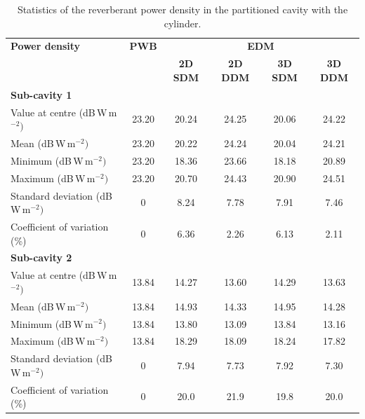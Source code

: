 \documentclass[a4paper]{article}
\numberwithin{equation}{section}
\begin{document}
\begin{table}[ht]
\begin{center}
\begin{tabular}{|l|c|c|c|c|c|}
\hline
\textbf{Power density}               &\textbf{PWB} &\multicolumn{4}{|c|}{\textbf{EDM}} \\ \cline{3-6}
{}                                   &{}           &\textbf{2D SDM} &\textbf{2D DDM} &\textbf{3D SDM} &\textbf{3D DDM} \\
\hline
\multicolumn{6}{|l|}{\textbf{Sub-cavity 1}} \\
\hline
Value at centre (dB\,W\,m$^{-2})$    &23.20        &20.24           &24.25           &20.06           &24.22 \\
Mean (dB\,W\,m$^{-2})$               &23.20        &20.22           &24.24           &20.04           &24.21 \\
Minimum (dB\,W\,m$^{-2})$            &23.20        &18.36           &23.66           &18.18           &20.89 \\
Maximum (dB\,W\,m$^{-2})$            &23.20        &20.70           &24.43           &20.90           &24.51 \\
Standard deviation (dB\,W\,m$^{-2})$ &0            &8.24            &7.78            &7.91            &7.46  \\
Coefficient of variation (\%)        &0            &6.36            &2.26            &6.13            &2.11  \\
\hline
\multicolumn{6}{|l|}{\textbf{Sub-cavity 2}} \\
\hline
Value at centre (dB\,W\,m$^{-2})$    &13.84        &14.27           &13.60           &14.29           &13.63 \\
Mean (dB\,W\,m$^{-2})$               &13.84        &14.93           &14.33           &14.95           &14.28 \\
Minimum (dB\,W\,m$^{-2})$            &13.84        &13.80           &13.09           &13.84           &13.16 \\
Maximum (dB\,W\,m$^{-2})$            &13.84        &18.29           &18.09           &18.24           &17.82 \\
Standard deviation (dB\,W\,m$^{-2})$ &0            &7.94            &7.73            &7.92            &7.30  \\
Coefficient of variation (\%)        &0            &20.0            &21.9            &19.8            &20.0  \\
\hline
\end{tabular}
\end{center}
\caption{\label{tb:partcyl} Statistics of the reverberant power density in the partitioned cavity with the cylinder.}
\end{table}
\end{document}
